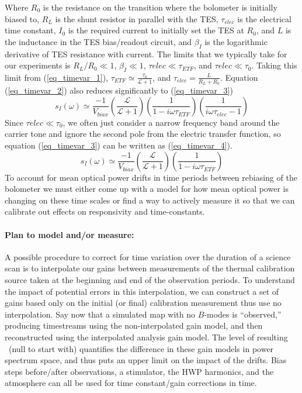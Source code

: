Where $R_0$ is the resistance on the transition where the bolometer is initially biased to, $R_L$ is the shunt resistor in parallel with the TES, $\tau_{elec}$ is the electrical time constant, $I_0$ is the required current to initially set the TES at $R_0$, and $L$ is the inductance in the TES bias/readout circuit, and $\beta_I$ is the logarithmic derivative of TES resistance with current. The limits that we typically take for our experiments is $R_L/R_0 \ll 1$, $\beta_I \ll 1$, $\tau{elec} \ll \tau_{ETF}$, and $\tau{elec} \ll \tau_0$. Taking this limit from (\ref{eq_timevar_1}), $\tau_{ETF} \simeq \frac{\tau_0}{\mathcal{L}+1}$, and $\tau_{elec} = \frac{L}{R_L+R_0}$. Equation (\ref{eq_timevar_2}) also reduces  significantly to (\ref{eq_timevar_3})
\begin{equation}
\label{eq_timevar_3}
s_I(\omega) \simeq \frac{-1}{V_{biax}}\left(\frac{\mathcal{L}}{\mathcal{L}+1}\right)\left(\frac{1}{1-i\omega\tau_{ETF}}\right)\left(\frac{1}{i\omega\tau_{elec}-1}\right)
\end{equation}
Since $\tau{elec} \ll \tau_0$, we often just consider a narrow frequency band around the carrier tone and ignore the second pole from the electric transfer function, so equation (\ref{eq_timevar_3}) can be written as (\ref{eq_timevar_4}).
\begin{equation}
\label{eq_timevar_4}
s_I(\omega) \simeq \frac{-1}{V_{biax}}\left(\frac{\mathcal{L}}{\mathcal{L}+1}\right)\left(\frac{1}{1-i\omega\tau_{ETF}}\right)
\end{equation}
To account for mean optical power drifts in time periods between rebiasing of the bolometer we must either come up with a model for how mean optical power is changing on these time scales or find a way to actively measure it so that we can calibrate out effects on responsivity and time-constants.

\paragraph{Plan to model and/or measure:}
A possible procedure to correct for time variation over the duration of a science scan is to interpolate our gains between measurements of the thermal calibration source taken at the beginning and end of the observation periods. To understand the impact of potential errors in this interpolation, we can construct a set of gains based only on the initial (or final) calibration measurement thus use no interpolation. Say now that a simulated map with no $B$-modes is ``observed,'' producing timestreams using the non-interpolated gain model, and then reconstructed using the interpolated analysis gain model.  The level of resulting \clbb\ (null to start with) quantifies the difference in these gain models in power spectrum space, and thus puts an upper limit on the impact of the drifts. Bias steps before/after observations, a stimulator, the HWP harmonics, and the atmosphere can all be used for time constant/gain corrections in time.

